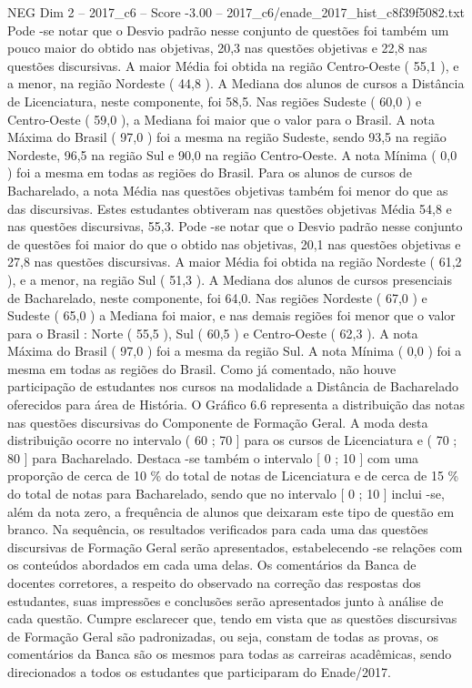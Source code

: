 \begin{textsample}{NEG Dim 2 – 2017\_c6 – Score -3.00 – 2017\_c6/enade\_2017\_hist\_c8f39f5082.txt}
Pode -se notar que o Desvio padrão nesse conjunto de questões foi também um pouco maior do obtido nas objetivas, 20,3 nas questões objetivas e 22,8 nas questões discursivas.
A maior Média foi obtida na região Centro-Oeste ( 55,1 ), e a menor, na região Nordeste ( 44,8 ).
A Mediana dos alunos de cursos a Distância de Licenciatura, neste componente, foi 58,5.
Nas regiões Sudeste ( 60,0 ) e Centro-Oeste ( 59,0 ), a Mediana foi maior que o valor para o Brasil.
A nota Máxima do Brasil ( 97,0 ) foi a mesma na região Sudeste, sendo 93,5 na região Nordeste, 96,5 na região Sul e 90,0 na região Centro-Oeste.
A nota Mínima ( 0,0 ) foi a mesma em todas as regiões do Brasil.
Para os alunos de cursos de Bacharelado, a nota Média nas questões objetivas também foi menor do que as das discursivas.
Estes estudantes obtiveram nas questões objetivas Média 54,8 e nas questões discursivas, 55,3.
Pode -se notar que o Desvio padrão nesse conjunto de questões foi maior do que o obtido nas objetivas, 20,1 nas questões objetivas e 27,8 nas questões discursivas.
A maior Média foi obtida na região Nordeste ( 61,2 ), e a menor, na região Sul ( 51,3 ).
A Mediana dos alunos de cursos presenciais de Bacharelado, neste componente, foi 64,0.
Nas regiões Nordeste ( 67,0 ) e Sudeste ( 65,0 ) a Mediana foi maior, e nas demais regiões foi menor que o valor para o Brasil : Norte ( 55,5 ), Sul ( 60,5 ) e Centro-Oeste ( 62,3 ).
A nota Máxima do Brasil ( 97,0 ) foi a mesma da região Sul.
A nota Mínima ( 0,0 ) foi a mesma em todas as regiões do Brasil.
Como já comentado, não houve participação de estudantes nos cursos na modalidade a Distância de Bacharelado oferecidos para área de História.
O Gráfico 6.6 representa a distribuição das notas nas questões discursivas do Componente de Formação Geral.
A moda desta distribuição ocorre no intervalo ( 60 ; 70 ] para os cursos de Licenciatura e ( 70 ; 80 ] para Bacharelado.
Destaca -se também o intervalo [ 0 ; 10 ] com uma proporção de cerca de 10 \% do total de notas de Licenciatura e de cerca de 15 \% do total de notas para Bacharelado, sendo que no intervalo [ 0 ; 10 ] inclui -se, além da nota zero, a frequência de alunos que deixaram este tipo de questão em branco.
Na sequência, os resultados verificados para cada uma das questões discursivas de Formação Geral serão apresentados, estabelecendo -se relações com os conteúdos abordados em cada uma delas.
Os comentários da Banca de docentes corretores, a respeito do observado na correção das respostas dos estudantes, suas impressões e conclusões serão apresentados junto à análise de cada questão.
Cumpre esclarecer que, tendo em vista que as questões discursivas de Formação Geral são padronizadas, ou seja, constam de todas as provas, os comentários da Banca são os mesmos para todas as carreiras acadêmicas, sendo direcionados a todos os estudantes que participaram do Enade/2017.

\end{textsample}
